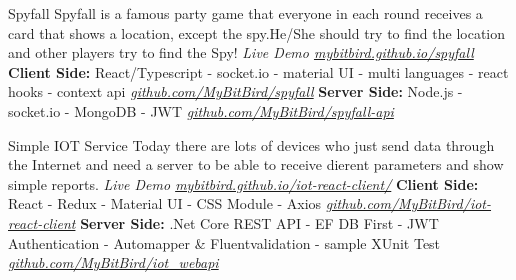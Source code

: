


\begin{cventries}


\cventry
{} %
{Spyfall} %
{} %
{} %
{ %
{Spyfall is a famous party game that everyone in each round receives a card that shows a location, except the spy.He/She should try to find the location and other players try to find the Spy!}
\break
{\it Live Demo \href{https://mybitbird.github.io/spyfall/}{mybitbird.github.io/spyfall}}
\break
\break
{\textbf{Client Side:}}
\break
{React/Typescript - socket.io - material UI - multi languages - react hooks - context api}
\break
{\it \href{https://github.com/MyBitBird/spyfall}{github.com/MyBitBird/spyfall}}
\break
{\textbf{Server Side:}}
\break
{Node.js - socket.io - MongoDB - JWT}
\break
{\it \href{https://github.com/MyBitBird/spyfall-api}{github.com/MyBitBird/spyfall-api}}
\break
}



\cventry
{} %
{Simple IOT Service} %
{} %
{} %
{ %
{Today there are lots of devices who just send data through the Internet and need a server to be able to receive dierent parameters and show simple reports.}
\break
{\it Live Demo \href{https://mybitbird.github.io/iot-react-client/}{mybitbird.github.io/iot-react-client/}}
\break
\break
{\textbf{Client Side:}}
\break
{React - Redux - Material UI - CSS Module - Axios}
\break
{\it \href{https://github.com/MyBitBird/iot-react-client}{github.com/MyBitBird/iot-react-client}}
\break
{\textbf{Server Side:}}
\break
{.Net Core REST API - EF DB First - JWT Authentication - Automapper \& Fluentvalidation - sample XUnit Test}
\break
{\it \href{https://github.com/MyBitBird/iot\_webapi}{github.com/MyBitBird/iot\_webapi}}
}


\end{cventries}